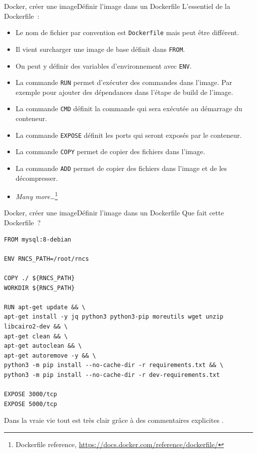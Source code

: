 \documentclass{beamer}
\begin{document}
    \begin{frame}{Docker, créer une image}{Définir l'image dans un Dockerfile}
        L'essentiel de la Dockerfile~:
        \begin{itemize}
            \item Le nom de fichier par convention est \lstinline{Dockerfile} mais peut être différent.
            \item Il vient surcharger une image de base définit dans \lstinline{FROM}.
            \item On peut y définir des variables d'environnement avec \lstinline{ENV}.
            \item La commande \lstinline{RUN} permet d'exécuter des commandes dans l'image.
            Par exemple pour ajouter des dépendances dans l'étape de build de l'image.
            \item La commande \lstinline{CMD} définit la commande qui sera exécutée au démarrage du conteneur.
            \item La commande \lstinline{EXPOSE} définit les ports qui seront exposés par le conteneur.
            \item La commande \lstinline{COPY} permet de copier des fichiers dans l'image.
            \item La commande \lstinline{ADD} permet de copier des fichiers dans l'image et de les décompresser.
            \item \textit{Many more\ldots}\footnote{Dockerfile reference, \url{https://docs.docker.com/reference/dockerfile/}}
        \end{itemize}
    \end{frame}

    \begin{frame}[fragile]{Docker, créer une image}{Définir l'image dans un Dockerfile}
        Que fait cette Dockerfile~?
        \begin{lstlisting}[basicstyle=\ttfamily\tiny]
FROM mysql:8-debian

ENV RNCS_PATH=/root/rncs

COPY ./ ${RNCS_PATH}
WORKDIR ${RNCS_PATH}

RUN apt-get update && \
apt-get install -y jq python3 python3-pip moreutils wget unzip libcairo2-dev && \
apt-get clean && \
apt-get autoclean && \
apt-get autoremove -y && \
python3 -m pip install --no-cache-dir -r requirements.txt && \
python3 -m pip install --no-cache-dir -r dev-requirements.txt

EXPOSE 3000/tcp
EXPOSE 5000/tcp
        \end{lstlisting}
        Dans la vraie vie tout est très clair grâce à des commentaires explicites .
    \end{frame}
\end{document}
